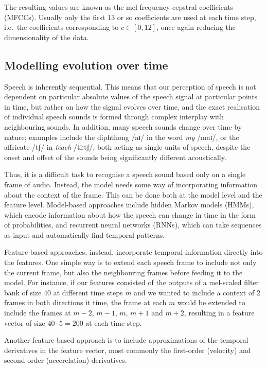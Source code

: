 The resulting values are known as the mel-frequency cepstral coefficients (MFCCs).
Usually only the first 13 or so coefficients are used at each time step, i.e.\ the coefficients corresponding to $c \in [0, 12]$, once again reducing the dimensionality of the data.

\subsection{Modelling evolution over time}

Speech is inherently sequential.
This means that our perception of speech is not dependent on particular absolute values of the speech signal at particular points in time, but rather on how the signal evolves over time, and the exact realisation of individual speech sounds is formed through complex interplay with neighbouring sounds.
In addition, many speech sounds change over time by nature; examples include the diphthong /aɪ/ in the word \emph{my} /maɪ/, or the affricate /tʃ/ in \emph{teach} /tiːtʃ/, both acting as single units of speech, despite the onset and offset of the sounds being significantly different acoustically.

Thus, it is a difficult task to recognise a speech sound based only on a single frame of audio.
Instead, the model needs some way of incorporating information about the context of the frame.
This can be done both at the model level and the feature level.
Model-based approaches include hidden Markov models (HMMs), which encode information about how the speech can change in time in the form of probabilities, and recurrent neural networks (RNNs), which can take sequences as input and automatically find temporal patterns.

Feature-based approaches, instead, incorporate temporal information directly into the features.
One simple way is to extend each speech frame to include not only the current frame, but also the neighbouring frames before feeding it to the model.
For instance, if our features consisted of the outputs of a mel-scaled filter bank of size 40 at different time steps $m$ and we wanted to include a context of 2 frames in both directions it time, the frame at each $m$ would be extended to include the frames at $m-2$, $m-1$, $m$, $m+1$ and $m+2$, resulting in a feature vector of size $40\cdot5 = 200$ at each time step.

Another feature-based approach is to include approximations of the temporal derivatives in the feature vector, most commonly the first-order (velocity) and second-order (accerelation) derivatives.

